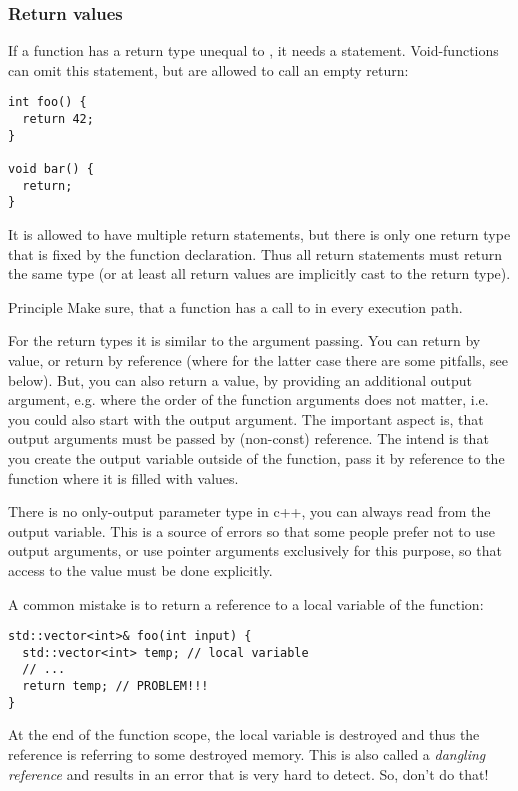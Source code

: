 \subsubsection{Return values}
If a function has a return type unequal to , it needs a  statement. Void-functions can omit this statement, but are allowed to
call an empty return:
\begin{verbatim}
int foo() {
  return 42;
}

void bar() {
  return;
}
\end{verbatim}

It is allowed to have multiple return statements, but there is only one return type that is fixed by the function declaration. Thus all return statements
must return the same type (or at least all return values are implicitly cast to the return type).

\begin{guideline}{Principle}
  Make sure, that a function has a call to  in every execution path.
\end{guideline}

For the return types it is similar to the argument passing. You can return by value, or return by reference (where for the latter case there
are some pitfalls, see below). But, you can also return a value, by providing an additional output argument, e.g.
%
%
where the order of the function arguments does not matter, i.e. you could also start with the output argument. The important aspect is, that
output arguments must be passed by (non-const) reference. The intend is that you create the output variable outside of the function, pass it by
reference to the function where it is filled with values.

\begin{rem}
  There is no only-output parameter type in c++, you can always read from the output variable. This is a source of errors so that some people prefer
  not to use output arguments, or use pointer arguments exclusively for this purpose, so that access to the value must be done explicitly.
\end{rem}

A common mistake is to return a reference to a local variable of the function:
\begin{verbatim}
std::vector<int>& foo(int input) {
  std::vector<int> temp; // local variable
  // ...
  return temp; // PROBLEM!!!
}
\end{verbatim}
At the end of the function scope, the local variable is destroyed and thus the reference is referring to some destroyed memory. This is also
called a \emph{dangling reference} and results in an error that is very hard to detect. So, don't do that!

